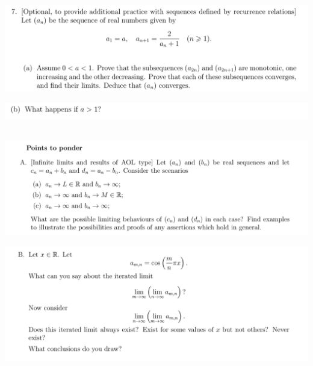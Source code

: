 \documentclass[12pt]{article}
\begin{document}
\newpage
\subsection{}
\begin{mdframed}
\includegraphics[width=400pt]{img/oxford-M2-analysis-I-4-7-a.png}
\end{mdframed}
\begin{mdframed}
\includegraphics[width=400pt]{img/oxford-M2-analysis-I-4-7-b.png}
\end{mdframed}

\newpage
\subsection{}
\begin{mdframed}
\includegraphics[width=400pt]{img/oxford-M2-analysis-I-extra-A.png}
\end{mdframed}
\begin{mdframed}
\includegraphics[width=400pt]{img/oxford-M2-analysis-I-extra-B.png}
\end{mdframed}
\end{document}

